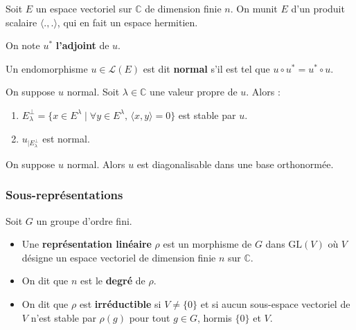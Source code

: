   Soit $E$ un espace vectoriel sur $\mathbb{C}$ de dimension finie $n$. On munit $E$ d'un produit scalaire $\langle . , . \rangle$, qui en fait un espace hermitien.


  \begin{notation}
    On note $u^*$ \textbf{l'adjoint} de $u$.
  \end{notation}

  \begin{definition}
    Un endomorphisme $u \in \mathcal{L}(E)$ est dit \textbf{normal} s'il est tel que $u \circ u^* = u^* \circ u$.
  \end{definition}

  \begin{proposition}
    On suppose $u$ normal. Soit $\lambda \in \mathbb{C}$ une valeur propre de $u$. Alors :
    \begin{enumerate}[label={\bfseries(\roman*)}]
      \item $E_\lambda^\perp = \{ x \in E^\lambda \mid \forall y \in E^\lambda, \, \langle x, y \rangle = 0 \}$ est stable par $u$.
      \item $u_{| E_\lambda^\perp}$ est normal.
    \end{enumerate}
  \end{proposition}

  \begin{corollary}
    On suppose $u$ normal. Alors $u$ est diagonalisable dans une base orthonormée.
  \end{corollary}

  \subsubsection{Sous-représentations}


  Soit $G$ un groupe d'ordre fini.

  \begin{definition}
    \begin{itemize}
      \item Une \textbf{représentation linéaire} $\rho$ est un morphisme de $G$ dans $\mathrm{GL}(V)$ où $V$ désigne un espace vectoriel de dimension finie $n$ sur $\mathbb{C}$.
      \item On dit que $n$ est le \textbf{degré} de $\rho$.
      \item On dit que $\rho$ est \textbf{irréductible} si $V \neq \{ 0 \}$ et si aucun sous-espace vectoriel de $V$ n'est stable par $\rho(g)$ pour tout $g \in G$, hormis $\{ 0 \}$ et $V$.
    \end{itemize}
  \end{definition}

